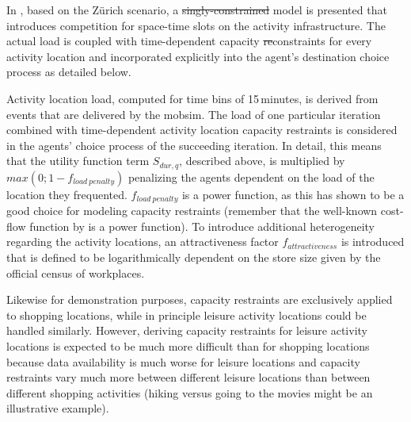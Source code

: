In \citet[][]{HorniEtAl_TRR_2009}, based on the Zürich scenario, a \st{singly-constrained} model is presented that introduces competition for space-time slots on the activity infrastructure. 
The actual load is coupled with time-dependent capacity \st{re}{\orange con}straints for every activity location and incorporated explicitly into the agent's destination choice process as detailed below.   

Activity location load, computed for time bins of 15\,minutes, is derived from events that are delivered by the \gls{mobsim}. 
The load of one particular iteration combined with time-dependent activity location capacity restraints is considered in the agents' choice process of the succeeding iteration. 
In detail, this means that the utility function term $S_{dur,q}$, described above, is multiplied by $max(0; 1 - f_{load\ penalty})$ penalizing the agents dependent on the load of the location they frequented. 
$f_{load\ penalty}$ is a power function, as this has shown to be a good choice for modeling capacity restraints (remember that the well-known cost-flow function by \citet[][]{TA_manual_1964} is a power function). 
To introduce additional heterogeneity regarding the activity locations, an attractiveness factor $f_{attractiveness}$ is introduced that is defined to be logarithmically dependent on the store size given by the official census of workplaces.

Likewise for demonstration purposes, capacity restraints are exclusively applied to shopping locations, while in principle leisure activity locations could be handled similarly. However, deriving capacity restraints for leisure activity locations is expected to be much more difficult than for shopping locations because data availability is much worse for leisure locations and capacity restraints vary much more between different leisure locations than between different shopping activities (hiking versus going to the movies might be an illustrative example).

